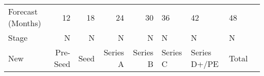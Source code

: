 \begin{tabular}{lrrrr} \toprule
Forecast (Months) & 12        & 18        & 24        & 30        & 36        & 42        & 48          \\
Stage             & N         & N         & N         & N         & N         & N         & N           \\ \midrule
New               &
Pre-Seed          &
Seed              &
Series A          &
Series B          &
Series C          &
Series D+/PE      &
Total             &
\bottomrule \end{tabular}
